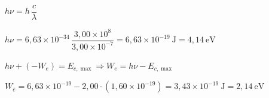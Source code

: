 \begin{solapartat}
 $h\nu = h\,\dfrac{c}{\lambda}$

 $h\nu = 6,63\times 10^{-34}\,\dfrac{3,00\times 10^{8}}{3,00\times 10^{-7}} = 6,63\times 10^{-19}\ \mathrm{J} = 4,14\ \mathrm{eV}$ 
\end{solapartat}

\begin{solapartat}
 $h\nu + (-W_e) = E_{c,\max} \Rightarrow W_e = h\nu - E_{c,\max}$

 $W_e = 6,63\times 10^{-19} - 2,00\cdot(1,60\times 10^{-19}) = 3,43\times 10^{-19}\ \mathrm{J} = 2,14\ \mathrm{eV}$ 
\end{solapartat}
